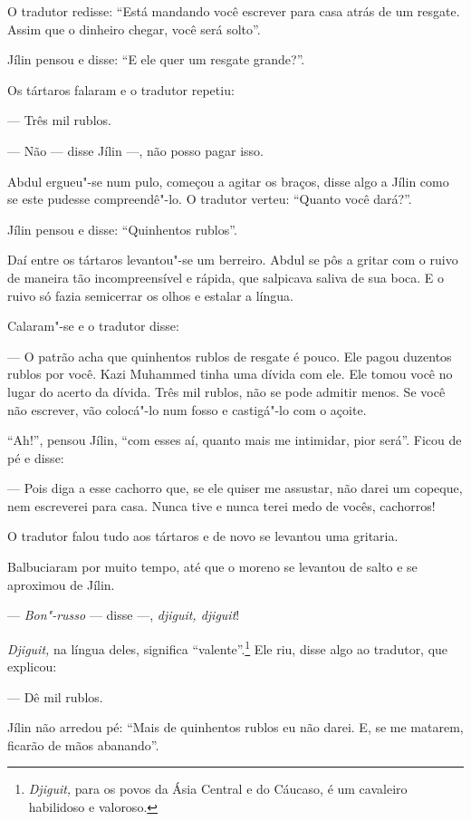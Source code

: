O tradutor redisse: ``Está mandando você escrever para casa atrás de um
resgate. Assim que o dinheiro chegar, você será solto''.

Jílin pensou e disse: ``E ele quer um resgate grande?''.

Os tártaros falaram e o tradutor repetiu:

--- Três mil rublos.

--- Não --- disse Jílin ---, não posso pagar isso.

Abdul ergueu"-se num pulo, começou a agitar os braços, disse algo a Jílin
como se este pudesse compreendê"-lo. O tradutor verteu: ``Quanto você
dará?''.

Jílin pensou e disse: ``Quinhentos rublos''.

Daí entre os tártaros levantou"-se um berreiro. Abdul se pôs a gritar com
o ruivo de maneira tão incompreensível e rápida, que salpicava saliva de
sua boca. E o ruivo só fazia semicerrar os olhos e estalar a língua.

Calaram"-se e o tradutor disse:

--- O patrão acha que quinhentos rublos de resgate é pouco. Ele pagou
duzentos rublos por você. Kazi Muhammed tinha uma dívida com ele. Ele
tomou você no lugar do acerto da dívida. Três mil rublos, não se pode
admitir menos. Se você não escrever, vão colocá"-lo num fosso e
castigá"-lo com o açoite.

``Ah!'', pensou Jílin, ``com esses aí, quanto mais me intimidar, pior
será''. Ficou de pé e disse:

--- Pois diga a esse cachorro que, se ele quiser me assustar, não darei
um copeque, nem escreverei para casa. Nunca tive e nunca terei medo de
vocês, cachorros!

O tradutor falou tudo aos tártaros e de novo se levantou uma gritaria.

Balbuciaram por muito tempo, até que o moreno se levantou de salto e se
aproximou de Jílin.

--- \emph{Bon"-russo} --- disse ---, \emph{djiguit, djiguit}!

\emph{Djiguit,} na língua deles, significa ``valente''.\footnote{\emph{Djiguit,}
  para os povos da Ásia Central e do Cáucaso, é um cavaleiro habilidoso
  e valoroso.} Ele riu, disse algo ao tradutor, que explicou:

--- Dê mil rublos.

Jílin não arredou pé: ``Mais de quinhentos rublos eu não darei. E, se me
matarem, ficarão de mãos abanando''.

